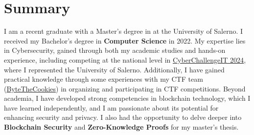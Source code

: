 \documentclass{color-cv}
\begin{document}
    
    
    
    
    \maketitle
    
    \section{Summary}
    I am a recent graduate with a Master's degree in  at the University of Salerno.
    I received my Bachelor's degree in \textbf{Computer Science} in 2022.
    My expertise lies in Cybersecurity, gained through both my academic studies and hands-on experience, including competing at the national level in \href{https://cyberchallenge.it/}{CyberChallengeIT 2024}, where I represented the University of Salerno. Additionally, I have gained practical knowledge through some experiences with my CTF team (\href{https://bytethecookies.github.io/}{ByteTheCookies}) in organizing and participating in CTF competitions. Beyond academia, I have developed strong competencies in blockchain technology, which I have learned independently, and I am passionate about its potential for enhancing security and privacy. I also had the opportunity to delve deeper into \textbf{Blockchain Security} and \textbf{Zero-Knowledge Proofs} for my master's thesis.
    
\end{document}
